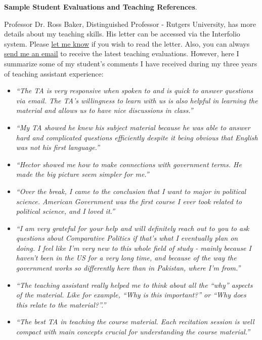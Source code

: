 
\newpage
{\bf Sample Student Evaluations and Teaching References}. 

Professor Dr. Ross Baker, Distinguished Professor - Rutgers University, has more details about my teaching skills. His letter can be accessed via the Interfolio system. Please \href{mailto:\filetext}{let me know} if you wish to read the letter. Also, you can always \href{mailto:\filetext}{send me an email} to receive the latest teaching evaluations. However, here I summarize some of my student's comments I have received during my three years of teaching assistant experience:


{\scriptsize
\begin{itemize}

\item \emph{``The TA is very responsive when spoken to and is quick to answer questions via email. The TA's willingness to learn with us is also helpful in learning the material and allows us to have nice discussions in class.''}

\item \emph{``My TA showed he knew his subject material because he was able to answer hard and complicated questions efficiently despite it being obvious that English was not his first language.''}

\item \emph{``Hector showed me how to make connections with government terms. He made the big picture seem simpler for me.''}

\item \emph{``Over the break, I came to the conclusion that I want to major in political science. American Government was the first course I ever took related to political science, and I loved it.''}

\item \emph{``I am very grateful for your help and will definitely reach out to you to ask questions about Comparative Politics if that's what I eventually plan on doing. I feel like I'm very new to this whole field of study - mainly because I haven't been in the US for a very long time, and because of the way the government works so differently here than in Pakistan, where I'm from.''}

\item \emph{``The teaching assistant really helped me to think about all the ``why'' aspects of the material. Like for example, ``Why is this important?'' or ``Why does this relate to the material?''.''}

\item \emph{``The best TA in teaching the course material. Each recitation session is well compact with main concepts crucial for understanding the course material.''}


\end{itemize}}
